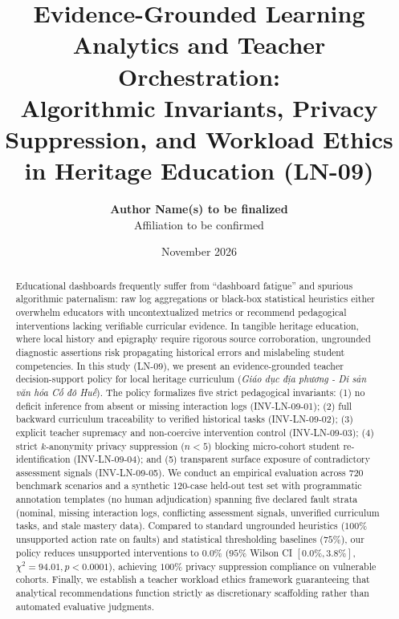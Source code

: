 \documentclass[11pt,a4paper]{article}
\title{\textbf{Evidence-Grounded Learning Analytics and Teacher Orchestration:\\
Algorithmic Invariants, Privacy Suppression, and Workload Ethics in Heritage Education (LN-09)}}
\author{\textbf{Author Name(s) to be finalized} \\ \small Affiliation to be confirmed}
\date{November 2026}
\begin{document}
\maketitle

\begin{abstract}
Educational dashboards frequently suffer from ``dashboard fatigue'' and spurious algorithmic paternalism: raw log aggregations or black-box statistical heuristics either overwhelm educators with uncontextualized metrics or recommend pedagogical interventions lacking verifiable curricular evidence. In tangible heritage education, where local history and epigraphy require rigorous source corroboration, ungrounded diagnostic assertions risk propagating historical errors and mislabeling student competencies.
In this study (LN-09), we present an evidence-grounded teacher decision-support policy for local heritage curriculum (\textit{Giáo dục địa phương - Di sản văn hóa Cố đô Huế}). The policy formalizes five strict pedagogical invariants: (1) no deficit inference from absent or missing interaction logs (\textsc{INV-LN-09-01}); (2) full backward curriculum traceability to verified historical tasks (\textsc{INV-LN-09-02}); (3) explicit teacher supremacy and non-coercive intervention control (\textsc{INV-LN-09-03}); (4) strict $k$-anonymity privacy suppression ($n < 5$) blocking micro-cohort student re-identification (\textsc{INV-LN-09-04}); and (5) transparent surface exposure of contradictory assessment signals (\textsc{INV-LN-09-05}).
We conduct an empirical evaluation across 720 benchmark scenarios and a synthetic 120-case held-out test set with programmatic annotation templates (no human adjudication) spanning five declared fault strata (nominal, missing interaction logs, conflicting assessment signals, unverified curriculum tasks, and stale mastery data). Compared to standard ungrounded heuristics ($100\%$ unsupported action rate on faults) and statistical thresholding baselines ($75\%$), our policy reduces unsupported interventions to $0.0\%$ ($95\%$ Wilson CI $[0.0\%, 3.8\%]$, $\chi^2 = 94.01, p < 0.0001$), achieving $100\%$ privacy suppression compliance on vulnerable cohorts. Finally, we establish a teacher workload ethics framework guaranteeing that analytical recommendations function strictly as discretionary scaffolding rather than automated evaluative judgments.
\end{abstract}
\end{document}
